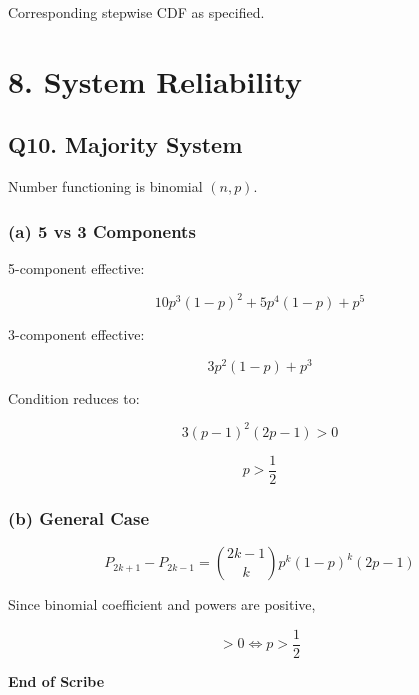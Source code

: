 \documentclass[12pt]{article}
\begin{document}
Corresponding stepwise CDF as specified.

\section*{8. System Reliability}

\subsection*{Q10. Majority System}

Number functioning is binomial $(n,p)$.

\subsubsection*{(a) 5 vs 3 Components}

5-component effective:

\[
10p^3(1-p)^2 + 5p^4(1-p) + p^5
\]

3-component effective:

\[
3p^2(1-p) + p^3
\]

Condition reduces to:

\[
3(p-1)^2(2p-1) > 0
\]

\[
p > \frac12
\]

\subsubsection*{(b) General Case}

\[
P_{2k+1} - P_{2k-1}
=
\binom{2k-1}{k}
p^k(1-p)^k (2p-1)
\]

Since binomial coefficient and powers are positive,

\[
> 0 \iff p > \frac12
\]

\vspace{0.5cm}
\begin{center}
\textbf{End of Scribe}
\end{center}
\end{document}
